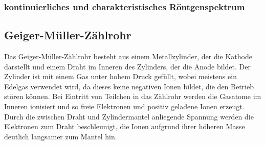 \documentclass[11pt, a4paper]{article}
\numberwithin{equation}{section}
\begin{document}
\subsubsection{kontinuierliches und charakteristisches Röntgenspektrum}


\subsection{Geiger-Müller-Zählrohr}
Das Geiger-Müller-Zählrohr besteht aus einem Metallzylinder, der die Kathode darstellt und einem Draht im Inneren des Zylinders, der die Anode bildet.
Der Zylinder ist mit einem Gas unter hohem Druck gefüllt, wobei meistens ein Edelgas verwendet wird, da dieses keine negativen Ionen bildet, die den Betrieb stören können.
Bei Eintritt von Teilchen in das Zählrohr werden die Gasatome im Inneren ionisiert und so freie Elektronen und positiv geladene Ionen erzeugt.
Durch die zwischen Draht und Zylindermantel anliegende Spannung werden die Elektronen zum Draht beschleunigt, die Ionen aufgrund ihrer höheren Masse deutlich langsamer zum Mantel hin.
\end{document}
